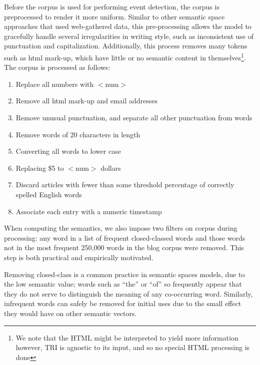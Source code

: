 \documentclass[a4paper,twocolumn,twoside,10pt]{ranlp}
\begin{document}
Before the corpus is used for performing event detection, the corpus is
preprocessed to render it more uniform.  Similar to other semantic space
approaches that used web-gathered data\cite{rohde09improved}, this
pre-processing allows the model to gracefully handle several irregularities in
writing style, such as inconsistent use of punctuation and capitalization.
Additionally, this process removes many tokens such as html mark-up, which have
little or no semantic content in themselves\footnote{We note that the HTML might
be interpreted to yield more information however, TRI is agnostic to its input,
and so no special HTML processing is done}.  The corpus is processed as follows:
{\small
\begin{enumerate}
  \setlength{\itemsep}{1pt}
  \setlength{\parskip}{0pt}
  \setlength{\parsep}{0pt}

  \item Replace all numbers with $<$num$>$

  \item Remove all html mark-up and email addresses

  \item Remove unusual punctuation, and separate all other punctuation from words
  
  \item Remove words of 20 characters in length
    
  \item Converting all words to lower case
  
  \item Replacing \$5 to $<$num$>$ dollars
  
  \item Discard articles with fewer than some threshold percentage of correctly
    spelled English words

  
  \item Associate each entry with a numeric timestamp
   
\end{enumerate}}
When computing the semantics, we also impose two filters on corpus during
processing: any word in a list of frequent closed-classed words and those words
not in the most frequent 250,000 words in the blog corpus were removed.  This
step is both practical and empirically motivated.  

Removing closed-class is a common practice in semantic spaces
models\cite{rohde09improved, sahlgren08permutations}, due to the low semantic
value; words such as ``the'' or ``of'' so frequently appear that they do not
serve to distinguish the meaning of any co-occurring word.  Similarly,
infrequent words can safely be removed for initial uses due to the small effect
they would have on other semantic vectors.
\end{document}
